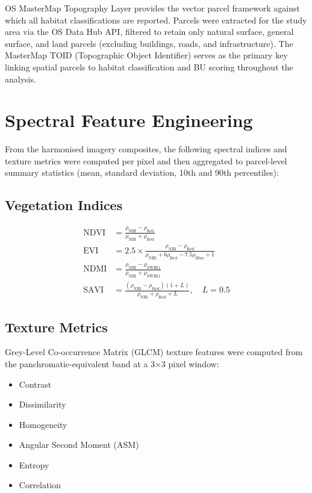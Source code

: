 OS MasterMap Topography Layer \citep{os_datahub} provides the vector parcel framework against which all habitat classifications are reported. Parcels were extracted for the study area via the OS Data Hub API, filtered to retain only natural surface, general surface, and land parcels (excluding buildings, roads, and infrastructure). The MasterMap TOID (Topographic Object Identifier) serves as the primary key linking spatial parcels to habitat classification and BU scoring throughout the analysis.


\section{Spectral Feature Engineering}

From the harmonised imagery composites, the following spectral indices and texture metrics were computed per pixel and then aggregated to parcel-level summary statistics (mean, standard deviation, 10th and 90th percentiles):

\subsection{Vegetation Indices}

\begin{align}
  \text{NDVI} &= \frac{\rho_{\text{NIR}} - \rho_{\text{Red}}}{\rho_{\text{NIR}} + \rho_{\text{Red}}} \label{eq:ndvi} \\[6pt]
  \text{EVI}  &= 2.5 \times \frac{\rho_{\text{NIR}} - \rho_{\text{Red}}}{\rho_{\text{NIR}} + 6\rho_{\text{Red}} - 7.5\rho_{\text{Blue}} + 1} \label{eq:evi} \\[6pt]
  \text{NDMI} &= \frac{\rho_{\text{NIR}} - \rho_{\text{SWIR1}}}{\rho_{\text{NIR}} + \rho_{\text{SWIR1}}} \label{eq:ndmi} \\[6pt]
  \text{SAVI} &= \frac{(\rho_{\text{NIR}} - \rho_{\text{Red}})(1 + L)}{\rho_{\text{NIR}} + \rho_{\text{Red}} + L}, \quad L = 0.5 \label{eq:savi}
\end{align}

\subsection{Texture Metrics}

Grey-Level Co-occurrence Matrix (GLCM) texture features were computed from the panchromatic-equivalent band at a 3$\times$3 pixel window:
\begin{itemize}[nosep]
  \item Contrast
  \item Dissimilarity
  \item Homogeneity
  \item Angular Second Moment (ASM)
  \item Entropy
  \item Correlation
\end{itemize}

